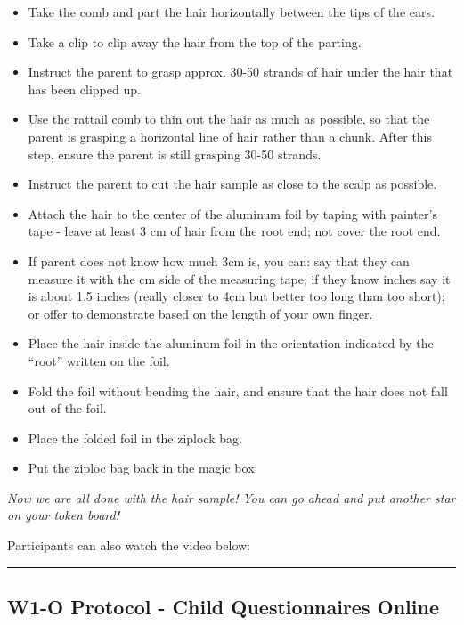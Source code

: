 \documentclass[]{book}
\providecommand{\tightlist}{%
  \setlength{\itemsep}{0pt}\setlength{\parskip}{0pt}}
\begin{document}
\begin{itemize}
\tightlist
\item
  Take the comb and part the hair horizontally between the tips of the ears.
\item
  Take a clip to clip away the hair from the top of the parting.
\item
  Instruct the parent to grasp approx. 30-50 strands of hair under the hair that has been clipped up.
\item
  Use the rattail comb to thin out the hair as much as possible, so that the parent is grasping a horizontal line of hair rather than a chunk. After this step, ensure the parent is still grasping 30-50 strands.
\item
  Instruct the parent to cut the hair sample as close to the scalp as possible.
\item
  Attach the hair to the center of the aluminum foil by taping with painter's tape - leave at least 3 cm of hair from the root end; not cover the root end.
\item
  If parent does not know how much 3cm is, you can: say that they can measure it with the cm side of the measuring tape; if they know inches say it is about 1.5 inches (really closer to 4cm but better too long than too short); or offer to demonstrate based on the length of your own finger.
\item
  Place the hair inside the aluminum foil in the orientation indicated by the ``root'' written on the foil.
\item
  Fold the foil without bending the hair, and ensure that the hair does not fall out of the foil.
\item
  Place the folded foil in the ziplock bag.
\item
  Put the ziploc bag back in the magic box.
\end{itemize}

\emph{Now we are all done with the hair sample! You can go ahead and put another star on your token board!}

Participants can also watch the video below:

\begin{center}\rule{0.5\linewidth}{0.5pt}\end{center}

\hypertarget{w1-o-protocol---child-questionnaires-online}{%
\subsection{W1-O Protocol - Child Questionnaires Online}\label{w1-o-protocol---child-questionnaires-online}}
\end{document}

